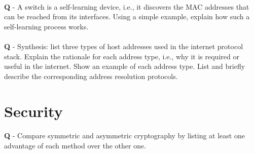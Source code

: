 \documentclass{llncs}
\newcounter{ques}
\renewcommand{\question}[1]{\paragraph{}\textbf{Q\theques} - #1\stepcounter{ques} }
\newcommand{\answer}[1]{}%
\begin{document}
\newpage

\question{A switch is a self-learning device, i.e., it discovers the
  MAC addresses that can be reached from its interfaces. Using
  a simple example, explain how such a self-learning process works.}

\answer{A switch maintains a table that matches MAC addresses to
  interfaces. When it receives a frame, it adds the source MAC address
  of this frame to the table with the interface on which the frame was
  received. A TTL is also added to remove entries after a certain
  amount of time. In this way, switches learn the interfaces on which
  MAC addresses can be reached as frames are being sent from this MAC addresses.}

\newpage

\question{Synthesis: list three types of host addresses used in the
  internet protocol stack. Explain the rationale for each address
  type, i.e., why it is required or useful in the internet. Show an
  example of each address type. List and briefly describe the
  corresponding address resolution protocols.}

\answer{ DNS names, IP addresses and MAC addresses are three types of
  host addresses used in the internet protocol stack.  The rationale
  for DNS is to provide human-readable names that are easy to
  remember, for instance \texttt{www.concordia.ca}. IP addresses are
  designed to facilitate routing at the global internet scale since
  prefixes identify sub-networks. An example of an IP address is
  \texttt{172.30.102.135}. MAC addresses identify a physical
  device. They are independent from the location of a host while the
  IP address of a host changes when the host changes network. An example of a MAC address is \texttt{f0:d5:bf:50:80:98}. Address resolution protocols are:
  \begin{itemize}
  \item DNS: to map DNS names to IP addresses.
  \item ARP: to map IP addresses to MAC addresses. 
  \end{itemize}
}

\newpage

\section{Security}


\question{Compare symmetric and asymmetric cryptography by listing at least one
  advantage of each method over the other one.}
\end{document}
